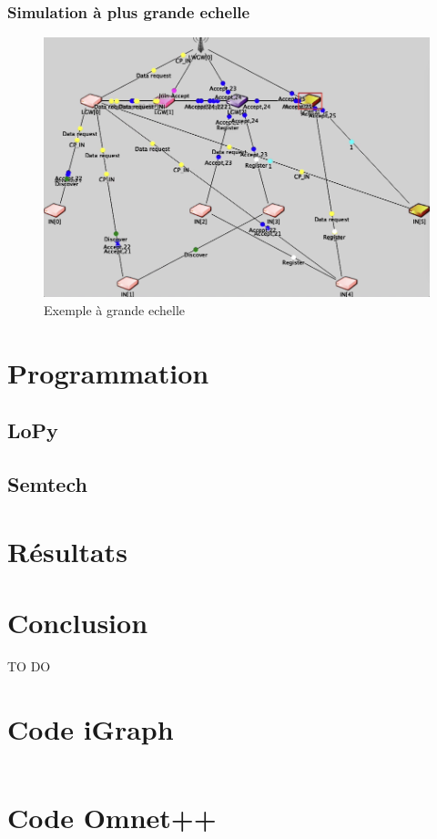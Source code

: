 \documentclass[11pt]{article}
\begin{document}
\subsubsection{Simulation à plus grande echelle }
\begin{figure}[!ht]
\centering
\includegraphics[scale=0.45]{fat.png} 
\caption{Exemple à grande echelle}
\end{figure}
\newpage
\section{Programmation}

\subsection{LoPy}
\subsection{Semtech}
\newpage
\section{Résultats}
\newpage
\section{Conclusion}
TO DO 
\newpage
\listoffigures

\newpage
\begin{appendices} 
\section{Code iGraph} 
\inputminted{csharp}{../igraph/loraGraph.py}
\newpage
\section{Code Omnet++} 
\end{appendices} 
\end{document}
